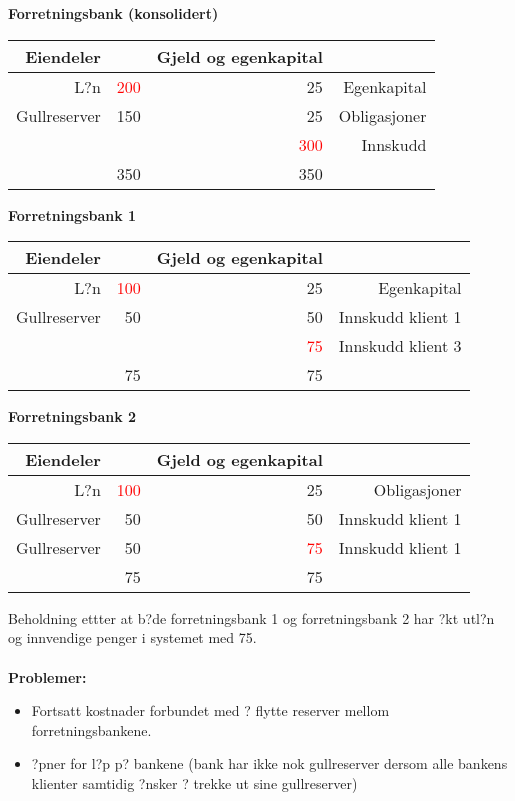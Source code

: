 \documentclass[a4paper,notitlepage]{article}
\begin{document}
\textbf{Forretningsbank (konsolidert)}
\begin{center}\begin{tabular}{rlrr}
    \textbf{Eiendeler} & \textbf{} & \textbf{Gjeld og egenkapital} & \textbf{} \\
\hline    L?n   & \textcolor{red}{200}    & 25    & Egenkapital \\
    Gullreserver  &  150   & 25    & Obligasjoner \\
          &       & \textcolor{red}{300}    & Innskudd \\
\hline          & 350   & 350   &  \\
\end{tabular}%
\end{center}
\noindent \textbf{Forretningsbank 1}
\begin{center}
\begin{tabular}{rrrr}
    \textbf{Eiendeler} & \textbf{} & \textbf{Gjeld og egenkapital} & \textbf{} \\
\hline    L?n   & \textcolor{red}{100}    & 25    & Egenkapital \\
    Gullreserver & 50    & 50    & Innskudd klient 1 \\
  &     & \textcolor{red}{75}    & Innskudd klient 3 \\

\hline          & 75    & 75    &  \\
\end{tabular}%
\end{center}
\noindent \textbf{Forretningsbank 2}
\begin{center}

\begin{tabular}{rrrr}
    \textbf{Eiendeler} & \textbf{} & \textbf{Gjeld og egenkapital} & \textbf{} \\
\hline    L?n   &\textcolor{red}{100}   & 25    & Obligasjoner \\
    Gullreserver & 50    & 50    & Innskudd klient 1 \\
    Gullreserver & 50    & \textcolor{red}{75}    & Innskudd klient 1 \\
\hline          & 75    & 75    &  \\
\end{tabular}%
\end{center}
Beholdning ettter at b?de forretningsbank 1 og forretningsbank 2 har ?kt utl?n og innvendige penger i systemet med 75.
\bigskip\\

\noindent\textbf{\\ Problemer:}\\
\begin{itemize}
\item Fortsatt kostnader forbundet med ? flytte reserver mellom forretningsbankene.
\item ?pner for l?p p? bankene (bank har ikke nok gullreserver dersom alle bankens klienter samtidig ?nsker ? trekke ut sine gullreserver)          \end{itemize}
\end{document}
